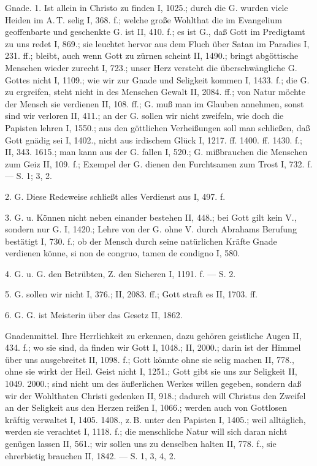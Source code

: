 Gnade. 1.  Ist allein in Christo zu finden I, 1025.; durch die  G. wurden viele Heiden im A.\,T. selig I, 368. f.; welche große Wohlthat die im Evangelium geoffenbarte und geschenkte G. ist II, 410. f.; es ist G., daß Gott im Predigtamt zu uns redet I, 869.; sie leuchtet hervor aus dem Fluch über Satan im Paradies I, 231. ff.; bleibt, auch wenn Gott zu zürnen scheint II, 1490.; bringt abgöttische Menschen wieder zurecht I, 723.; unser Herz versteht die überschwängliche G. Gottes nicht I, 1109.; wie wir zur Gnade und Seligkeit kommen I, 1433. f.; die G. zu ergreifen, steht nicht in des Menschen Gewalt II, 2084. ff.; von Natur möchte der Mensch sie verdienen II, 108. ff.; G. muß man im Glauben annehmen, sonst sind wir verloren II, 411.; an der G. sollen wir nicht zweifeln, wie doch die Papisten lehren I, 1550.; aus den göttlichen Verheißungen soll man schließen, daß Gott gnädig sei I, 1402., nicht aus irdischem Glück I, 1217. ff. 1400. ff. 1430. f.; II, 343. 1615.; man kann aus der G. fallen I, 520.; G. mißbrauchen die Menschen zum Geiz II, 109. f.; Exempel der G. dienen den Furchtsamen zum Trost I, 732. f. — S.  1;  3,  2.

2. G.  Diese Redeweise schließt alles Verdienst aus I, 497. f.

3. G. u.  Können nicht neben einander bestehen II, 448.; bei Gott gilt kein V., sondern nur G. I, 1420.; Lehre von der G. ohne V. durch Abrahams Berufung bestätigt I, 730. f.; ob der Mensch durch seine natürlichen Kräfte Gnade verdienen könne, si non de congruo, tamen de condigno I, 580.

4. G. u.  G. den Betrübten, Z. den Sicheren I, 1191. f. — S.  2.

5.  G.  sollen wir nicht I, 376.; II, 2083. ff.; Gott straft es II, 1703. ff.

6. G.  G. ist Meisterin über das Gesetz II, 1862.

Gnadenmittel. Ihre Herrlichkeit zu erkennen, dazu gehören geistliche Augen II, 434. f.; wo sie sind, da finden wir Gott I, 1048.; II, 2000.; darin ist der Himmel über uns ausgebreitet II, 1098. f.; Gott könnte ohne sie selig machen II, 778., ohne sie wirkt der Heil. Geist nicht I, 1251.; Gott gibt sie uns zur Seligkeit II, 1049. 2000.; sind nicht um des äußerlichen Werkes willen gegeben, sondern daß wir der Wohlthaten Christi gedenken II, 918.; dadurch will Christus den Zweifel an der Seligkeit aus den Herzen reißen I, 1066.; werden auch von Gottlosen kräftig verwaltet I, 1405. 1408., z.\,B. unter den Papisten I, 1405.; weil alltäglich, werden sie verachtet I, 1118. f.; die menschliche Natur will sich daran nicht genügen lassen II, 561.; wir sollen uns zu denselben halten II, 778. f., sie ehrerbietig brauchen II, 1842. — S.  1,  3, 4,  2.

